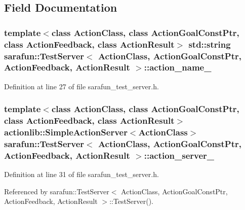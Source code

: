 \subsection{Field Documentation}
\hypertarget{classsarafun_1_1TestServer_abe393cc25c73386e7d6783127adf98d9_abe393cc25c73386e7d6783127adf98d9}{
\subsubsection[{action\-\_\-name\-\_\-}]{\setlength{\rightskip}{0pt plus 5cm}template$<$class Action\-Class, class Action\-Goal\-Const\-Ptr, class Action\-Feedback, class Action\-Result$>$ std\-::string {\bf sarafun\-::\-Test\-Server}$<$ Action\-Class, Action\-Goal\-Const\-Ptr, Action\-Feedback, Action\-Result $>$\-::action\-\_\-name\-\_\-\hspace{0.3cm}{\ttfamily [protected]}}}\label{classsarafun_1_1TestServer_abe393cc25c73386e7d6783127adf98d9_abe393cc25c73386e7d6783127adf98d9}


Definition at line 27 of file sarafun\-\_\-test\-\_\-server.\-h.

\hypertarget{classsarafun_1_1TestServer_aa7c467f8ff244a483678570b3c028983_aa7c467f8ff244a483678570b3c028983}{
\subsubsection[{action\-\_\-server\-\_\-}]{\setlength{\rightskip}{0pt plus 5cm}template$<$class Action\-Class, class Action\-Goal\-Const\-Ptr, class Action\-Feedback, class Action\-Result$>$ actionlib\-::\-Simple\-Action\-Server$<$Action\-Class$>$ {\bf sarafun\-::\-Test\-Server}$<$ Action\-Class, Action\-Goal\-Const\-Ptr, Action\-Feedback, Action\-Result $>$\-::action\-\_\-server\-\_\-\hspace{0.3cm}{\ttfamily [private]}}}\label{classsarafun_1_1TestServer_aa7c467f8ff244a483678570b3c028983_aa7c467f8ff244a483678570b3c028983}


Definition at line 31 of file sarafun\-\_\-test\-\_\-server.\-h.



Referenced by sarafun\-::\-Test\-Server$<$ Action\-Class, Action\-Goal\-Const\-Ptr, Action\-Feedback, Action\-Result $>$\-::\-Test\-Server().

